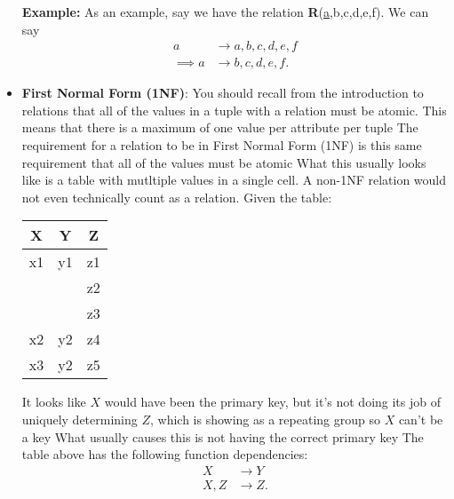 \documentclass{report}
\begin{document}
\begin{itemize}
            \bigbreak \noindent 
            \textbf{Example:} As an example, say we have the relation \textbf{R}(\underline{a},b,c,d,e,f). We can say
            \begin{align*}
                a &\to a,b,c,d,e,f \\
                \implies a&\to b,c,d,e,f
            .\end{align*}
        \item \textbf{First Normal Form (1NF)}: You should recall from the introduction to relations that all of the values in a tuple with a relation must be atomic. This means that there is a maximum of one value per attribute per tuple
            \bigbreak \noindent 
            The requirement for a relation to be in First Normal Form (1NF) is this same requirement that all of the values must be atomic
            \bigbreak \noindent 
            What this usually looks like is a table with mutltiple values in a single cell. A non-1NF relation would not even technically count as a relation.
            \bigbreak \noindent 
            Given the table:
            \bigbreak \noindent 
            \begin{center}
                \begin{tabular}{|c|c|c|}
                    \hline
                    X  & Y  & Z  \\ \hline
                    x1 & y1 & z1 \\ 
                       &    & z2 \\ 
                       &    & z3 \\ \hline
                    x2 & y2 & z4 \\ \hline
                    x3 & y2 & z5 \\ \hline
                \end{tabular}
            \end{center}
            \bigbreak \noindent 
            It looks like $X$ would have been the primary key, but it's not doing its job of uniquely determining $Z$, which is showing as a repeating group so $X$ can't be a key
            \bigbreak \noindent 
            What usually causes this is not having the correct primary key
            \bigbreak \noindent 
            The table above has the following function dependencies:
            \begin{align*}
                X &\to Y \\
               X,Z &\to Z
            .\end{align*}
            \bigbreak \noindent 

\end{itemize}
\end{document}
